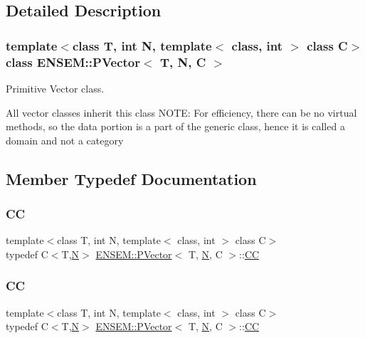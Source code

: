 \subsection{Detailed Description}
\subsubsection*{template$<$class T, int N, template$<$ class, int $>$ class C$>$\newline
class E\+N\+S\+E\+M\+::\+P\+Vector$<$ T, N, C $>$}

Primitive Vector class. 

All vector classes inherit this class N\+O\+TE\+: For efficiency, there can be no virtual methods, so the data portion is a part of the generic class, hence it is called a domain and not a category 

\subsection{Member Typedef Documentation}
\mbox{\label{classENSEM_1_1PVector_a92dc0a0a301a3dc96f7be5d337019bc7}} 
\subsubsection{\texorpdfstring{CC}{CC}\hspace{0.1cm}{\footnotesize\ttfamily [1/3]}}
{\footnotesize\ttfamily template$<$class T, int N, template$<$ class, int $>$ class C$>$ \\
typedef C$<$T,\mbox{\hyperlink{adat__devel_2lib_2hadron_2operator__name__util_8cc_a7722c8ecbb62d99aee7ce68b1752f337}{N}}$>$ \mbox{\hyperlink{classENSEM_1_1PVector}{E\+N\+S\+E\+M\+::\+P\+Vector}}$<$ T, \mbox{\hyperlink{adat__devel_2lib_2hadron_2operator__name__util_8cc_a7722c8ecbb62d99aee7ce68b1752f337}{N}}, C $>$\+::\mbox{\hyperlink{classENSEM_1_1PVector_a92dc0a0a301a3dc96f7be5d337019bc7}{CC}}}

\mbox{\label{classENSEM_1_1PVector_a92dc0a0a301a3dc96f7be5d337019bc7}} 
\subsubsection{\texorpdfstring{CC}{CC}\hspace{0.1cm}{\footnotesize\ttfamily [2/3]}}
{\footnotesize\ttfamily template$<$class T, int N, template$<$ class, int $>$ class C$>$ \\
typedef C$<$T,\mbox{\hyperlink{adat__devel_2lib_2hadron_2operator__name__util_8cc_a7722c8ecbb62d99aee7ce68b1752f337}{N}}$>$ \mbox{\hyperlink{classENSEM_1_1PVector}{E\+N\+S\+E\+M\+::\+P\+Vector}}$<$ T, \mbox{\hyperlink{adat__devel_2lib_2hadron_2operator__name__util_8cc_a7722c8ecbb62d99aee7ce68b1752f337}{N}}, C $>$\+::\mbox{\hyperlink{classENSEM_1_1PVector_a92dc0a0a301a3dc96f7be5d337019bc7}{CC}}}

